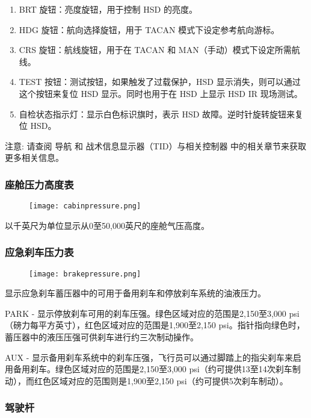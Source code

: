 \begin{enumerate}
	\item BRT 旋钮：亮度旋钮，用于控制 HSD 的亮度。
	\item HDG 旋钮：航向选择旋钮，用于 TACAN 模式下设定参考航向游标。
	\item CRS 旋钮：航线旋钮，用于在 TACAN 和 MAN（手动）模式下设定所需航线。
	\item TEST 按钮：测试按钮，如果触发了过载保护，HSD 显示消失，则可以通过这个按钮来复位 HSD 显示。同时也用于在 HSD 上显示 HSD IR 现场测试。
	\item 自检状态指示灯：显示白色标识旗时，表示 HSD 故障。逆时针旋转旋钮来复位 HSD。
\end{enumerate}

注意:	请查阅 导航 和 战术信息显示器（TID）与相关控制器 中的相关章节来获取更多相关信息。

\subsubsection{座舱压力高度表}

\begin{figure}[htb]
	\centering
	\texttt{[image: cabinpressure.png]}
\end{figure}
以千英尺为单位显示从0至50,000英尺的座舱气压高度。

\subsubsection{应急刹车压力表}

\begin{figure}[htb]
	\centering
	\texttt{[image: brakepressure.png]}
\end{figure}
显示应急刹车蓄压器中的可用于备用刹车和停放刹车系统的油液压力。

PARK - 显示停放刹车可用的刹车压强。绿色区域对应的范围是2,150至3,000 psi（磅力每平方英寸），红色区域对应的范围是1,900至2,150 psi。指针指向绿色时，蓄压器中的液压压强可供刹车进行约三次制动操作。

AUX - 显示备用刹车系统中的刹车压强，飞行员可以通过脚踏上的指尖刹车来启用备用刹车。绿色区域对应的范围是2,150至3,000 psi（约可提供13至14次刹车制动），而红色区域对应的范围则是1,900至2,150 psi（约可提供5次刹车制动）。

\subsubsection{驾驶杆}

